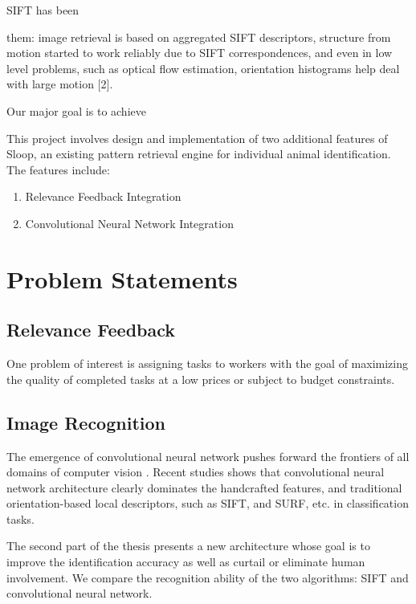 SIFT has been 

them: image retrieval is based on aggregated SIFT descriptors, structure from motion started to work reliably due to SIFT correspondences, and even in low level problems, such as optical flow estimation, orientation histograms help deal with large motion [2].

Our major goal is to achieve 

This project involves design and implementation of two additional features of Sloop, an existing pattern retrieval engine for individual animal identification. The features include:
\begin{enumerate}
	\item Relevance Feedback Integration
	\item Convolutional Neural Network Integration
\end{enumerate}

\section{Problem Statements}

\subsection{Relevance Feedback} %
\label{sub:relevance_feedback}
One problem of interest is assigning tasks to workers with the goal of maximizing the quality of completed tasks at a low prices or subject to budget constraints.

\subsection{Image Recognition} %
\label{sub:image_recognition}
The emergence of convolutional neural network pushes forward the frontiers of all domains of computer vision \cite{lecun95}. Recent studies shows that convolutional neural network architecture clearly dominates the handcrafted features, and traditional orientation-based local descriptors, such as SIFT\cite{lowe04}, and SURF\cite{surf08}, etc. in classification tasks\cite{fisher14, kriz12}.

The second part of the thesis presents a new architecture whose goal is to improve the identification accuracy as well as curtail or eliminate human involvement. We compare the recognition ability of the two algorithms: SIFT and convolutional neural network. 

